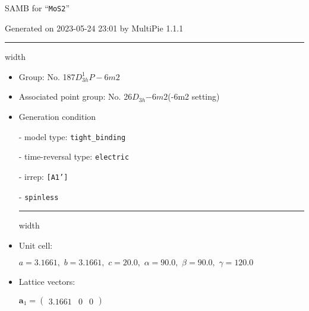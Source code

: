 \documentclass[fleqn,10pt,landscape]{article}
\begin{document}
\setcounter{MaxMatrixCols}{16}

\setlength{\baselineskip}{16pt}
\footnotesize
\begin{center}
\LARGE
SAMB for ``\texttt{MoS2}''
\end{center}
\begin{flushright}
Generated on 2023-05-24 23:01 by MultiPie 1.1.1
\end{flushright}
\vspace{1cm}


 \hfil \hrule height 1mm width \textwidth \hfil

\begin{itemize}
\item Group: No. 187\quad$D_{3h}^{1}$\quad$P-6m2$\quad[ hexagonal ]

\item Associated point group: No. 26\quad$D_{3h}$\quad$-6m2$\quad(-6m2 setting)\quad[ hexagonal ]

\vspace{5mm}

\item Generation condition

\quad - model type: \texttt{tight_binding}

\quad - time-reversal type: \texttt{electric}

\quad - irrep: \texttt{[A1']}

\quad - \texttt{spinless}


 \hfil \hrule height 1mm width \textwidth \hfil

\item Unit cell:

\quad $a=3.1661,\,\, b=3.1661,\,\, c=20.0,\,\, \alpha=90.0,\,\, \beta=90.0,\,\, \gamma=120.0$

\item Lattice vectors:

\quad $\bm{a}_1=\begin{pmatrix} 3.1661 & 0 & 0 \end{pmatrix}$


\end{itemize}
\end{document}
